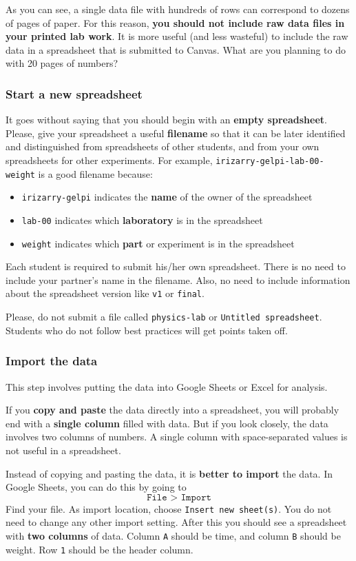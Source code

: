 As you can see, a single data file with hundreds of rows can correspond to dozens of pages of paper. For this reason, \textbf{you should not include raw data files in your printed lab work}. It is more useful (and less wasteful) to include the raw data in a spreadsheet that is submitted to Canvas. What are you planning to do with 20 pages of numbers?
%
\subsubsection{Start a new spreadsheet}
%
It goes without saying that you should begin with an \textbf{empty spreadsheet}. Please, give your spreadsheet a useful \textbf{filename} so that it can be later identified and distinguished from spreadsheets of other students, and from your own spreadsheets for other experiments. For example, \texttt{irizarry-gelpi-lab-00-weight} is a good filename because:
\begin{itemize}
    \item \texttt{irizarry-gelpi} indicates the \textbf{name} of the owner of the spreadsheet
    \item \texttt{lab-00} indicates which \textbf{laboratory} is in the spreadsheet
    \item \texttt{weight} indicates which \textbf{part} or experiment is in the spreadsheet
\end{itemize}
Each student is required to submit his/her own spreadsheet. There is no need to include your partner's name in the filename. Also, no need to include information about the spreadsheet version like \texttt{v1} or \texttt{final}.

Please, do not submit a file called \texttt{physics-lab} or \texttt{Untitled spreadsheet}. Students who do not follow best practices will get points taken off.
%
\subsubsection{Import the data}
%
This step involves putting the data into Google Sheets or Excel for analysis.

If you \textbf{copy and paste} the data directly into a spreadsheet, you will probably end with a \textbf{single column} filled with data. But if you look closely, the data involves two columns of numbers. A single column with space-separated values is not useful in a spreadsheet.

Instead of copying and pasting the data, it is \textbf{better to import} the data. In Google Sheets, you can do this by going to
\begin{equation}
    \texttt{File > Import}
\end{equation}
Find your file. As import location, choose \texttt{Insert new sheet(s)}. You do not need to change any other import setting. After this you should see a spreadsheet with \textbf{two columns} of data. Column \texttt{A} should be time, and column \texttt{B} should be weight. Row \texttt{1} should be the header column.

